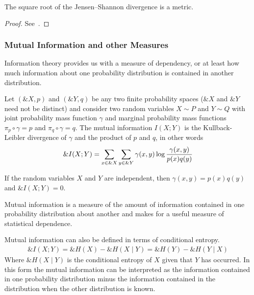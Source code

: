 \begin{theorem}
  The square root of the Jensen–Shannon divergence is a metric.
\end{theorem}
\begin{proof}
  See~\cite{ref:endres-2003}.
\end{proof}

\subsubsection*{Mutual Information and other Measures}

Information theory provides us with a measure of dependency, or at least how
much information about one probability distribution is contained in another
distribution.

\begin{definition}
  Let $(\&X, p)$ and $(\&Y, q)$ be any two finite probability spaces
  ($\&X$ and $\&Y$ need not be distinct) and consider two random
  variables $X \sim P$ and $Y \sim Q$ with joint probability mass
  function $\gamma$ and marginal probability mass functions
  $\pi_p \circ \gamma = p$ and $\pi_q \circ \gamma = q$. The
  \textnormal{\sffamily mutual information} $I(X;Y)$ is the
  Kullback-Leibler divergence of $\gamma$ and the product of $p$ and
  $q$, in other words
  \begin{align}
    \label{eq:mutual-information}
    \&I(X; Y) = \sum_{x \in \&X}\sum_{y \in \&Y}\gamma(x, y) \log{{\gamma(x, y) \over p(x)q(y)}}
  \end{align}
\end{definition}

\begin{theorem}
  If the random variables $X$ and $Y$ are independent, then $\gamma(x,y) = p(x)q(y)$
  and $\&I(X; Y) = 0$.
\end{theorem}

\begin{remark}
  Mutual information is a measure of the amount of information contained in one
  probability distribution about another and makes for a useful measure of
  statistical dependence.
\end{remark}

\begin{remark} Mutual information can also be defined in terms of conditional
  entropy.
  \begin{align}
    \label{eq:mutual-information-alt}
    \&I(X; Y) = \&H(X) - \&H(X \mid Y) = \&H(Y) - \&H(Y \mid X)
  \end{align}
  Where $\&H(X \mid Y)$ is the conditional entropy of $X$ given that $Y$ has
  occurred. In this form the mutual information can be interpreted as the
  information contained in one probability distribution minus the information
  contained in the distribution when the other distribution is known.
  \end{remark}

